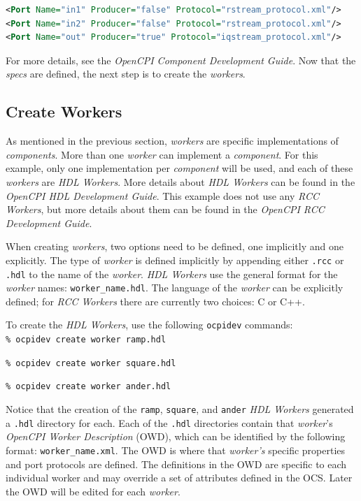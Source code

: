 \begin{lstlisting}[language=xml]
<Port Name="in1" Producer="false" Protocol="rstream_protocol.xml"/>
<Port Name="in2" Producer="false" Protocol="rstream_protocol.xml"/>
<Port Name="out" Producer="true" Protocol="iqstream_protocol.xml"/>
\end{lstlisting}
\bend
For more details, see the \textit{OpenCPI Component Development Guide}. Now that the \textit{specs} are defined, the next step is to create the \textit{workers}.

\subsection{Create Workers}
As mentioned in the previous section, \textit{workers} are specific implementations of \textit{components}. More than one \textit{worker} can implement a \textit{component}. For this example, only one implementation per \textit{component} will be used, and each of these \textit{workers} are \textit{HDL Workers}. More details about \textit{HDL Workers} can be found in the \textit{OpenCPI HDL Development Guide}. This example does not use any \textit{RCC Workers}, but more details about them can be found in the \textit{OpenCPI RCC Development Guide}.\newline

When creating \textit{workers}, two options need to be defined, one implicitly and one explicitly. The type of \textit{worker} is defined implicitly by appending either \verb+.rcc+ or \verb+.hdl+ to the name of the \textit{worker}. \textit{HDL Workers} use the general format for the \textit{worker} names: \verb+worker_name.hdl+. The language of the \textit{worker} can be explicitly defined; for \textit{RCC Workers} there are currently two choices: C or C++.\newline

To create the \textit{HDL Workers}, use the following \verb+ocpidev+ commands:\\

\forceindent\verb+% ocpidev create worker ramp.hdl+

\forceindent\verb+% ocpidev create worker square.hdl+

\forceindent\verb+% ocpidev create worker ander.hdl+\\

\OcpidevCreate{}

Notice that the creation of the \verb+ramp+, \verb+square+, and \verb+ander+ \textit{HDL Workers} generated a \verb+.hdl+ directory for each. Each of the \verb+.hdl+ directories contain that \textit{worker}'s \textit{OpenCPI Worker Description} (OWD), which can be identified by the following format: \verb+worker_name.xml+. The OWD is where that \textit{worker's} specific properties and port protocols are defined. The definitions in the OWD are specific to each individual worker and may override a set of attributes defined in the OCS. Later the OWD will be edited for each \textit{worker}.\newline

